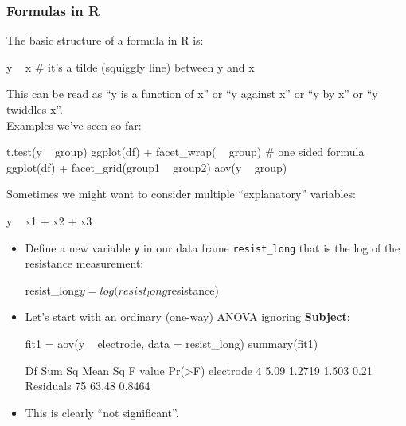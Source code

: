 \documentclass[a4paper]{article}
\begin{document}
\subsubsection{Formulas in R}
The basic structure of a formula in R is:
\begin{Schunk}
\begin{Sinput}
y ~ x # it's a tilde (squiggly line) between y and x
\end{Sinput}
\end{Schunk}
This can be read as ``y is a function of x'' or ``y against x'' or ``y by x'' or ``y twiddles x''.\\
Examples we've seen so far:
\begin{Schunk}
\begin{Sinput}
t.test(y ~ group)
ggplot(df) + facet_wrap( ~ group) # one sided formula
ggplot(df) + facet_grid(group1 ~ group2)
aov(y ~ group)
\end{Sinput}
\end{Schunk}
Sometimes we might want to consider multiple ``explanatory'' variables:
\begin{Schunk}
\begin{Sinput}
y ~ x1 + x2 + x3
\end{Sinput}
\end{Schunk}
\begin{itemize}
	\item Define a new variable \lstinline|y| in our data frame \lstinline|resist_long| that is the log of the resistance measurement:
\begin{Schunk}
\begin{Sinput}
resist_long$y = log(resist_long$resistance)
\end{Sinput}
\end{Schunk}
	\item Let's start with an ordinary (one-way) ANOVA ignoring \textcolor{myred}{\textbf{Subject}}:
\begin{Schunk}
\begin{Sinput}
fit1 = aov(y ~ electrode, data = resist_long)
summary(fit1)
\end{Sinput}
\begin{Soutput}
            Df Sum Sq Mean Sq F value Pr(>F)
electrode    4   5.09  1.2719   1.503   0.21
Residuals   75  63.48  0.8464               
\end{Soutput}
\end{Schunk}
	\item This is clearly ``not significant''.
\end{itemize}
\end{document}
